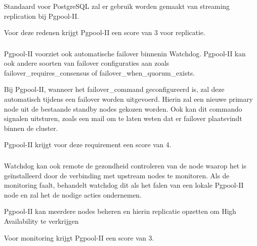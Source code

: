 Standaard voor PostgreSQL zal er gebruik worden gemaakt van streaming replication bij Pgpool-II.

Voor deze redenen krijgt Pgpool-II een score van 3 voor replicatie.

\subsubsection{}
\label{subsubsec:Failover}

Pgpool-II voorziet ook automatische failover binnenin Watchdog. Pgpool-II kan ook andere soorten van failover configuraties aan zoals failover\_requires\_consensus of \newline failover\_when\_quorum\_exists. 

Bij Pgpool-II, wanneer het failover\_command geconfigureerd is, zal deze automatisch tijdens een failover worden uitgevoerd. Hierin zal een nieuwe primary node uit de bestaande standby nodes gekozen worden. Ook kan dit commando signalen uitsturen, zoals een mail om te laten weten dat er failover plaatsvindt binnen de cluster.

Pgpool-II krijgt voor deze requirement een score van 4.

\subsubsection{}
\label{subsubsec:Monitoring}

Watchdog kan ook remote de gezondheid controleren van de node waarop het is geïnstalleerd door de verbinding met upstream nodes te monitoren. Als de monitoring faalt, behandelt watchdog dit als het falen van een lokale Pgpool-II node en zal het de nodige acties ondernemen.

Pgpool-II kan meerdere nodes beheren en hierin replicatie opzetten om High Availability te verkrijgen

Voor monitoring krijgt Pgpool-II een score van 3.

\subsection{}
\label{subsec:Should have}


\subsubsection{}
\label{subsubsec:Actieve ondersteuning in 2020-2021}

